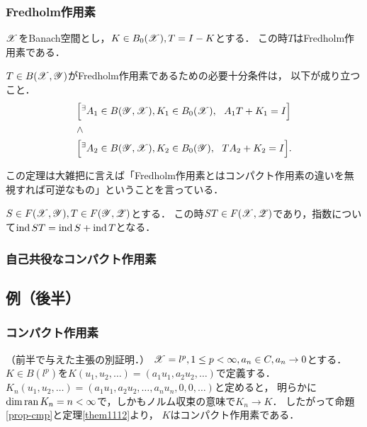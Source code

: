     \subsubsection{Fredholm作用素}
    \begin{Them}[定理11.20, p.262] \label{them1120}
        $\mathscr{X}$をBanach空間とし，$K \in B_0(\mathscr{X}), T=I-K$とする．
        この時$T$はFredholm作用素である．
    \end{Them}
    \begin{Them}[定理11.24, p.264] \label{them1124}
        $T \in B(\mathscr{X},\mathscr{Y})$がFredholm作用素であるための必要十分条件は，
        以下が成り立つこと．
        \begin{align*}
            &\Big[{}^{\exists} A_1 \in B(\mathscr{Y},\mathscr{X}), K_1 \in B_0(\mathscr{X}),~~ A_1 T+K_1=I \Big] \\
            &\land \\
            &\Big[{}^{\exists} A_2 \in B(\mathscr{Y},\mathscr{X}), K_2 \in B_0(\mathscr{Y}),~~ T A_2+K_2=I \Big]
            .
        \end{align*}
    \end{Them}
    この定理は大雑把に言えば「Fredholm作用素とはコンパクト作用素の違いを無視すれば可逆なもの」ということを言っている．

    \begin{Them}[定理11.25, p.265] \label{them1125}
        $S \in F(\mathscr{X}, \mathscr{Y}), T \in F(\mathscr{Y},\mathscr{Z})$とする．
        この時$ST \in F(\mathscr{X},\mathscr{Z})$であり，指数について$\operatorname{ind} ST=\operatorname{ind} S+\operatorname{ind} T$となる．
    \end{Them}


    \subsubsection{自己共役なコンパクト作用素}

    \subsection{例（後半）}
    \subsubsection{コンパクト作用素}
    \begin{Example}[問, p.258]
        （前半で与えた主張の別証明．）
        $\mathscr{X}=l^p, 1 \leq p<\infty, a_n \in C, a_n \to 0$とする．
        $K \in B(l^p)$を$K(u_1,u_2,\dots)=(a_1u_1,a_2u_2,\dots)$で定義する．
        $K_n(u_1,u_2,\dots)=(a_1u_1,a_2u_2,\dots,a_nu_n,0,0,\dots)$と定めると，
        明らかに$\dim \operatorname{ran} K_n=n<\infty$で，しかもノルム収束の意味で$K_n \to K$．
        したがって命題\ref{prop-cmp}と定理\ref{them1112}より，
        $K$はコンパクト作用素である．
    \end{Example}
